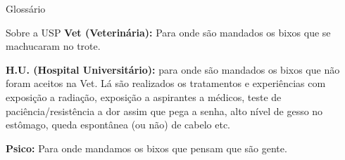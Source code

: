 \begin{secao}{Glossário}
\begin{subsecao}{Sobre a USP}
{\bf Vet (Veterinária):} Para onde são mandados os bixos que se machucaram no
trote.

{\bf H.U. (Hospital Universitário):} para onde são mandados os bixos que não
foram aceitos na Vet. Lá são realizados os tratamentos e experiências com
exposição a radiação, exposição a aspirantes a médicos, teste de
paciência/resistência a dor assim que pega a senha, alto nível de gesso no
estômago, queda espontânea (ou não) de cabelo etc.

{\bf Psico:} Para onde mandamos os bixos que pensam que são gente.

\end{subsecao}
\end{secao}
